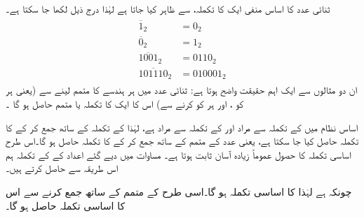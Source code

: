  ثنائی عدد     کا اساس منفی ایک کا   تکملہ،      سے ظاہر کیا جاتا ہے لہٰذا  درج ذیل لکھا جا سکتا ہے۔
\begin{gather}
\begin{aligned}
\overline{1}_2&=0_2\\
\overline{0}_2&=1_2\\
\overline{1001}_2&=0110_2\\
\overline{101110}_2&=010001_2
\end{aligned}
\end{gather}
ان دو مثالوں سے ایک اہم  حقیقت   واضح ہوتا ہے: ثنائی عدد  میں ہر ہندسے کا متمم لینے سے (یعنی  ہر   کو ،  اور ہر   کو  کرنے سے)  اس کا ایک کا  تکملہ   یا متمم  حاصل ہو گا ۔


  اساس  نظام میں   کے  تکملہ سے مراد    اور   کے تکملہ    سے مراد  ہے،  لہٰذا   کے تکملہ  کے ساتھ  جمع کر کے    کا تکملہ  حاصل کیا جا سکتا ہے، یعنی عدد کے متمم کے ساتھ    جمع کر کے   کا تکملہ  حاصل ہو گا۔اس طرح اساسی تکملہ کا حصول عموماً   زیادہ آسان ثابت ہوتا ہے۔  مساوات  میں دیے گئے   اعداد کے     کے تکملہ   ہم اس طریقہ سے حاصل کرتے ہیں۔
  
چونکہ  ہے    لہٰذا    کا اساسی تکملہ   ہو گا۔اسی طرح    کے متمم    کے ساتھ  جمع کرنے سے اس    کا اساسی تکملہ  حاصل  ہو گا۔

